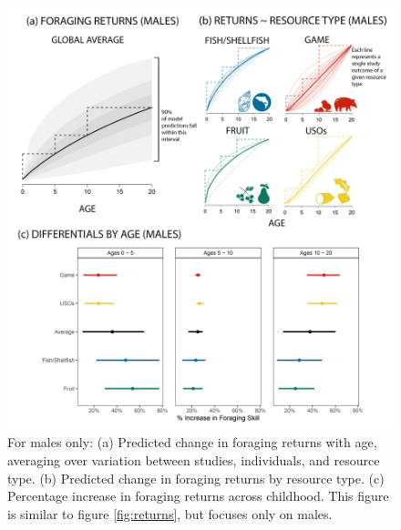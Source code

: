 \begin{figure}[h]
\centering
\includegraphics[width=12cm] {text/images/supplementary/by_resource_supp_returns_male.png}
\renewcommand{\thefigure}{S\arabic{figure}}
\caption{For males only: (a) Predicted change in foraging returns with age, averaging over variation between studies, individuals, and resource type. (b) Predicted change in foraging returns by resource type. (c) Percentage increase in foraging returns across childhood. This figure is similar to figure \ref{fig:returns}, but focuses only on males.}
\label{fig:males_only}
\end{figure}

